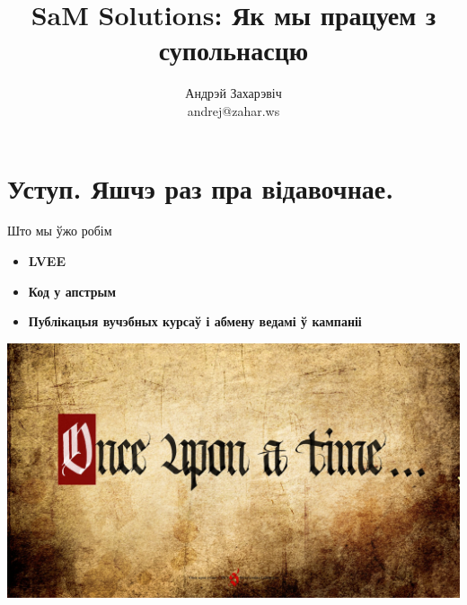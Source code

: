 \documentclass[ignorenonframetext,hyperref={pdftex,unicode}]{beamer}
\title{SaM Solutions: Як мы працуем з супольнасцю} %
\author["Андрэй Захарэвіч"]{Андрэй Захарэвіч\\ andrej@zahar.ws} %
\begin{document}

\frame{\titlepage} %


\section{Уступ. Яшчэ раз пра відавочнае.} %

\begin{frame}{Што мы ўжо робім} %
	\begin{itemize}
		\item \textbf{LVEE}
			\pause
		\item \textbf{Код у апстрым}
			\pause
		\item \textbf{Публікацыя вучэбных курсаў і абмену ведамі ў кампаніі}
	\end{itemize}
	\begin{center}
 		\includegraphics[width=\textwidth,height=0.8\textheight,keepaspectratio]{Once_upon_a_time} %
	\end{center}
\end{frame} %
\end{document}
